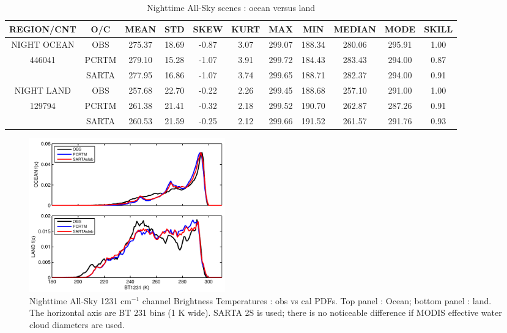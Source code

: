 \documentclass[agupp]{aguplus}              %
\newcommand{\wn}{cm$^{-1}$\xspace}
\begin{document}
\begin{article}
\begin{center}
\begin{table}[ht]
{\small
\hfill{}
\begin{tabular}{ccccccccccc} %
\hline\hline %
  REGION/CNT    & O/C & MEAN  & STD & SKEW & KURT & MAX & MIN & MEDIAN & MODE & SKILL\\
\hline
NIGHT OCEAN   & OBS   & 275.37 & 18.69  & -0.87 &  3.07 & 299.07 & 188.34 & 280.06 & 295.91 &  1.00 \\
   446041        & PCRTM & 279.10 & 15.28  & -1.07 &  3.91 & 299.72 & 184.43 & 283.43 & 294.00 &  0.87 \\ 
              & SARTA & 277.95 & 16.86  & -1.07 &  3.74 & 299.65 & 188.71 & 282.37 & 294.00 & 0.91 \\
\hline
NIGHT LAND    & OBS   & 257.68 & 22.70  & -0.22 &  2.26 & 299.45 & 188.68 & 257.10 & 291.00 &  1.00  \\
   129794        & PCRTM & 261.38 & 21.41  & -0.32 &  2.18 & 299.52 & 190.70 & 262.87 & 287.26 & 0.91 \\
              & SARTA & 260.53 & 21.59  & -0.25 &  2.12 & 299.66 & 191.52 & 261.57 & 291.76 & 0.93 \\
\hline %
\end{tabular}}
\hfill{}
\caption{Nighttime All-Sky scenes : ocean versus land}
\label{table:allsky_all} %
\end{table}
\end{center}

\begin{figure}[h]
\noindent\includegraphics[width=20pc]{FIGS/ecm_cloudBT1231_gev_land_ocean}
\caption{Nighttime All-Sky 1231 \wn channel Brightness Temperatures : obs vs cal PDFs.
Top panel : Ocean; bottom panel : land. The horizontal axis are BT 231 bins 
(1 K wide). SARTA 2S is used; there is no noticeable
difference if MODIS effective water cloud diameters are used.}
\label{bt1231_night_allsky_land_ocean}
\end{figure}


\end{article}
\end{document}
